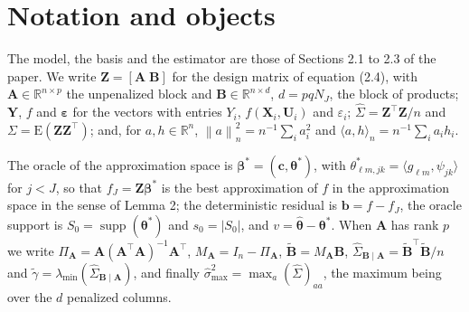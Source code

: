 \documentclass[10pt]{book}
\theoremstyle{definition}
\newcommand{\R}{\mathbb{R}}
\newcommand{\E}{\mathrm{E}}
\newcommand{\T}{^{\top}}
\newcommand{\normn}[1]{\left\lVert #1 \right\rVert_{n}}
\newcommand{\inner}[2]{\langle #1, #2 \rangle}
\newcommand{\cv}{\ell}
\newcommand{\md}{m}
\newcommand{\lev}{j}
\newcommand{\tsl}{k}
\newcommand{\NJ}{N_{J}}
\newcommand{\bX}{\mathbf{X}}
\newcommand{\bU}{\mathbf{U}}
\newcommand{\bZ}{\mathbf{Z}}
\newcommand{\gcomp}[2]{g_{#1#2}}
\newcommand{\wav}[2]{\psi_{#1#2}}
\newcommand{\coefs}[4]{\theta^{*}_{#1#2,#3#4}}
\newcommand{\btheta}{\boldsymbol{\theta}}
\newcommand{\thetastar}{\btheta^{*}}
\newcommand{\thetahat}{\widehat{\btheta}}
\newcommand{\bbeta}{\boldsymbol{\beta}}
\newcommand{\betastar}{\bbeta^{*}}
\newcommand{\bc}{\mathbf{c}}
\newcommand{\Gram}{\Sigma}
\newcommand{\Gramhat}{\widehat{\Sigma}}
\newcommand{\Szero}{S_{0}}
\newcommand{\Amat}{\mathbf{A}}
\newcommand{\Bmat}{\mathbf{B}}
\newcommand{\Btil}{\widetilde{\Bmat}}
\newcommand{\PA}{\Pi_{\Amat}}
\newcommand{\MA}{M_{\Amat}}
\newcommand{\bveps}{\boldsymbol{\varepsilon}}
\newcommand{\bb}{\mathbf{b}}
\newcommand{\bY}{\mathbf{Y}}
\newcommand{\smax}{\widehat{\sigma}_{\max}}
\newcommand{\gtil}{\widetilde{\gamma}}
\newcommand{\lmin}{\lambda_{\min}}
\newcommand{\GBA}{\Gramhat_{\Bmat\mid\Amat}}
\DeclareMathOperator{\supp}{supp}
\begin{document}
\fontsize{12}{14pt plus.8pt minus .6pt}\selectfont

\section{Notation and objects}

The model, the basis and the estimator are those of Sections 2.1 to 2.3 of the
paper. We write $\bZ = [\Amat\;\Bmat]$ for the design matrix of equation
(2.4), with $\Amat \in \R^{n\times p}$ the unpenalized block and
$\Bmat \in \R^{n\times d}$, $d = pq\NJ$, the block of products; $\bY$, $f$ and
$\bveps$ for the vectors with entries $Y_i$, $f(\bX_i,\bU_i)$ and
$\varepsilon_i$; $\Gramhat = \bZ\T\bZ/n$ and $\Gram = \E(\bZ\bZ\T)$; and, for
$a, h \in \R^n$, $\normn{a}^2 = n^{-1}\sum_i a_i^2$ and
$\inner{a}{h}_n = n^{-1}\sum_i a_ih_i$.

The \textcolor{colR1}{oracle of the approximation space} is $\betastar = (\bc,\thetastar)$, with
$\coefs{\cv}{\md}{\lev}{\tsl} = \inner{\gcomp{\cv}{\md}}{\wav{\lev}{\tsl}}$
for $\lev < J$, so that $f_J = \bZ\betastar$ is the best approximation of $f$
in the \textcolor{colR1}{approximation space} in the sense of Lemma 2; the deterministic residual is
$\bb = f - f_J$, the oracle support is $\Szero = \supp(\thetastar)$ and
$s_0 = |\Szero|$, and $v = \thetahat - \thetastar$. When $\Amat$ has rank $p$
we write $\PA = \Amat(\Amat\T\Amat)^{-1}\Amat\T$, $\MA = I_n - \PA$,
$\Btil = \MA\Bmat$, $\GBA = \Btil\T\Btil/n$ and $\gtil = \lmin(\GBA)$, and
finally $\smax^2 = \max_a(\Gramhat)_{aa}$, the maximum being over the $d$
penalized columns.
\end{document}
